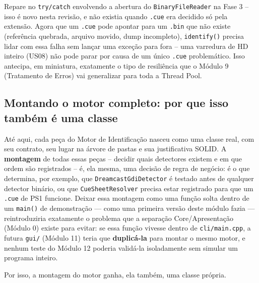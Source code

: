 \begin{CaixaAlerta}
Repare no \texttt{try/catch} envolvendo a abertura do \texttt{BinaryFileReader} na Fase 3 -- isso é novo nesta revisão, e não existia quando \texttt{.cue} era decidido só pela extensão. Agora que um \texttt{.cue} pode apontar para um \texttt{.bin} que não existe (referência quebrada, arquivo movido, dump incompleto), \texttt{identify()} precisa lidar com essa falha sem lançar uma exceção para fora -- uma varredura de HD inteiro (US08) não pode parar por causa de um único \texttt{.cue} problemático. Isso antecipa, em miniatura, exatamente o tipo de resiliência que o Módulo 9 (Tratamento de Erros) vai generalizar para toda a Thread Pool.
\end{CaixaAlerta}

\subsection{Montando o motor completo: por que isso também é uma classe}
\label{sec:engine-factory}

Até aqui, cada peça do Motor de Identificação nasceu como uma classe real, com seu contrato, seu lugar na árvore de pastas e sua justificativa SOLID. A \textbf{montagem} de todas essas peças -- decidir quais detectores existem e em que ordem são registrados -- é, ela mesma, uma decisão de regra de negócio: é o que determina, por exemplo, que \texttt{DreamcastGdiDetector} é testado antes de qualquer detector binário, ou que \texttt{CueSheetResolver} precisa estar registrado para que um \texttt{.cue} de PS1 funcione. Deixar essa montagem como uma função solta dentro de um \texttt{main()} de demonstração --- como uma primeira versão deste módulo fazia --- reintroduziria exatamente o problema que a separação Core/Apresentação (Módulo 0) existe para evitar: se essa função vivesse dentro de \texttt{cli/main.cpp}, a futura \texttt{gui/} (Módulo 11) teria que \textbf{duplicá-la} para montar o mesmo motor, e nenhum teste do Módulo 12 poderia validá-la isoladamente sem simular um programa inteiro.

Por isso, a montagem do motor ganha, ela também, uma classe própria.

